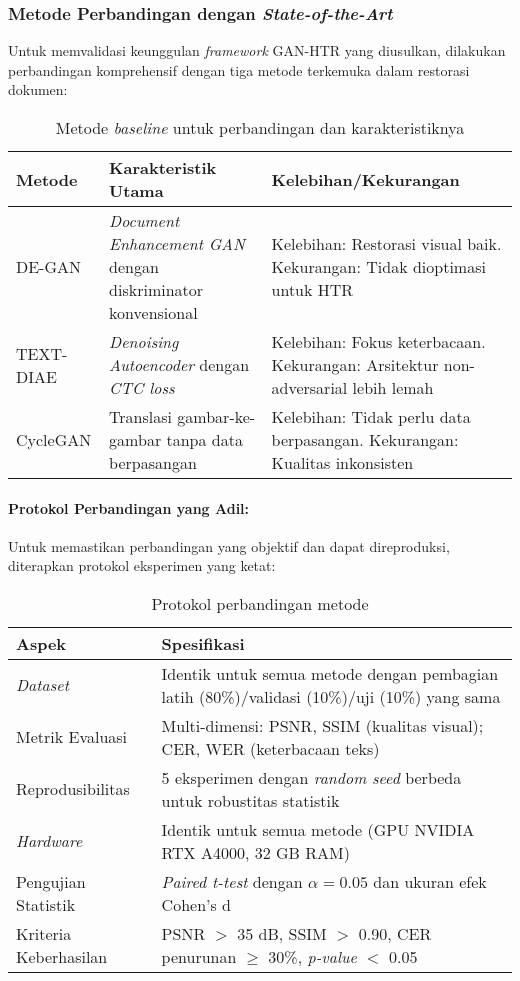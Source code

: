 \documentclass[12pt,a4paper]{article}
\begin{document}
\subsubsection{Metode Perbandingan dengan \textit{State-of-the-Art}}
Untuk memvalidasi keunggulan \textit{framework} GAN-HTR yang diusulkan, dilakukan perbandingan komprehensif dengan tiga metode terkemuka dalam restorasi dokumen:

\begin{table}[H]
\centering
\caption{Metode \textit{baseline} untuk perbandingan dan karakteristiknya}
\label{tab:baseline-methods}
\small
\begin{tabular}{|l|p{5cm}|p{5.5cm}|}
\hline
\textbf{Metode} & \textbf{Karakteristik Utama} & \textbf{Kelebihan/Kekurangan} \\ \hline
DE-GAN & \textit{Document Enhancement GAN} dengan diskriminator konvensional & Kelebihan: Restorasi visual baik. Kekurangan: Tidak dioptimasi untuk HTR \\ \hline
TEXT-DIAE & \textit{Denoising Autoencoder} dengan \textit{CTC loss} & Kelebihan: Fokus keterbacaan. Kekurangan: Arsitektur non-adversarial lebih lemah \\ \hline
CycleGAN & Translasi gambar-ke-gambar tanpa data berpasangan & Kelebihan: Tidak perlu data berpasangan. Kekurangan: Kualitas inkonsisten \\ \hline
\end{tabular}
\end{table}

\paragraph{Protokol Perbandingan yang Adil:}
Untuk memastikan perbandingan yang objektif dan dapat direproduksi, diterapkan protokol eksperimen yang ketat:

\begin{table}[H]
\centering
\caption{Protokol perbandingan metode}
\label{tab:comparison-protocol}
\small
\begin{tabular}{|l|p{10cm}|}
\hline
\textbf{Aspek} & \textbf{Spesifikasi} \\ \hline
\textit{Dataset} & Identik untuk semua metode dengan pembagian latih (80\%)/validasi (10\%)/uji (10\%) yang sama \\ \hline
Metrik Evaluasi & Multi-dimensi: PSNR, SSIM (kualitas visual); CER, WER (keterbacaan teks) \\ \hline
Reprodusibilitas & 5 eksperimen dengan \textit{random seed} berbeda untuk robustitas statistik \\ \hline
\textit{Hardware} & Identik untuk semua metode (GPU NVIDIA RTX A4000, 32 GB RAM) \\ \hline
Pengujian Statistik & \textit{Paired t-test} dengan $\alpha = 0.05$ dan ukuran efek Cohen's d \\ \hline
Kriteria Keberhasilan & PSNR $>$ 35 dB, SSIM $>$ 0.90, CER penurunan $\geq$ 30\%, \textit{p-value} $<$ 0.05 \\ \hline
\end{tabular}
\end{table}
\end{document}
